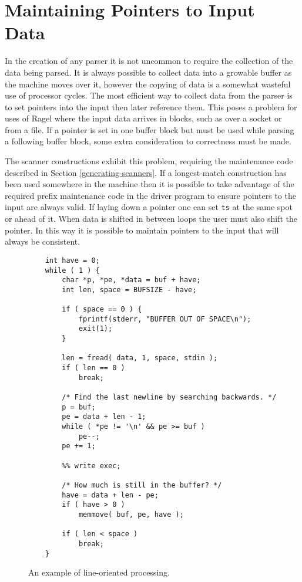 \documentclass[letterpaper,11pt,oneside]{book}
\begin{document}
\section{Maintaining Pointers to Input Data}

In the creation of any parser it is not uncommon to require the collection of
the data being parsed.  It is always possible to collect data into a growable
buffer as the machine moves over it, however the copying of data is a somewhat
wasteful use of processor cycles. The most efficient way to collect data from
the parser is to set pointers into the input then later reference them.  This
poses a problem for uses of Ragel where the input data arrives in blocks, such
as over a socket or from a file. If a pointer is set in one buffer block but
must be used while parsing a following buffer block, some extra consideration
to correctness must be made.

The scanner constructions exhibit this problem, requiring the maintenance
code described in Section \ref{generating-scanners}. If a longest-match
construction has been used somewhere in the machine then it is possible to
take advantage of the required prefix maintenance code in the driver program to
ensure pointers to the input are always valid. If laying down a pointer one can
set \verb|ts| at the same spot or ahead of it. When data is shifted in
between loops the user must also shift the pointer.  In this way it is possible
to maintain pointers to the input that will always be consistent.

\begin{figure}
\small
\begin{verbatim}
    int have = 0;
    while ( 1 ) {
        char *p, *pe, *data = buf + have;
        int len, space = BUFSIZE - have;

        if ( space == 0 ) { 
            fprintf(stderr, "BUFFER OUT OF SPACE\n");
            exit(1);
        }

        len = fread( data, 1, space, stdin );
        if ( len == 0 )
            break;

        /* Find the last newline by searching backwards. */
        p = buf;
        pe = data + len - 1;
        while ( *pe != '\n' && pe >= buf )
            pe--;
        pe += 1;

        %% write exec;

        /* How much is still in the buffer? */
        have = data + len - pe;
        if ( have > 0 )
            memmove( buf, pe, have );

        if ( len < space )
            break;
    }
\end{verbatim}
\caption{An example of line-oriented processing.}
\label{line-oriented}
\end{figure}
\end{document}
